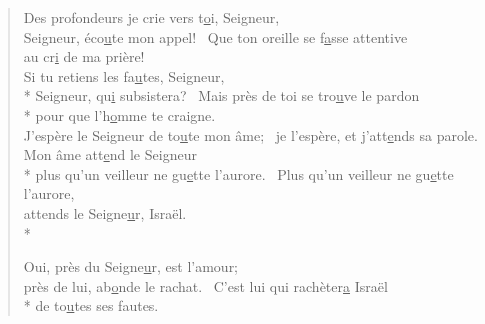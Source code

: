 
\begin{verse}

Des profondeurs je crie vers t\underline{o}i, Seigneur, \\
Seigneur, éco\underline{u}te mon appel!~\psalmstar
Que ton oreille se f\underline{a}sse attentive \\
au cr\underline{i} de ma prière! \\

Si tu retiens les fa\underline{u}tes, Seigneur, \\*
Seigneur, qu\underline{i} subsistera?~\psalmstar
{}Mais près de toi se tro\underline{u}ve le pardon \\*
pour que l’h\underline{o}mme te craigne. \\

J’espère le Seigneur de to\underline{u}te mon âme;~\psalmstar
je l’espère, et j’att\underline{e}nds sa parole. \\

Mon âme att\underline{e}nd le Seigneur \\*
plus qu’un veilleur ne gu\underline{e}tte l’aurore.~\psalmstar
Plus qu’un veilleur ne gu\underline{e}tte l’aurore, \\
attends le Seigne\underline{u}r, Israël. \\*

Oui, près du Seigne\underline{u}r, est l’amour; \\
près de lui, ab\underline{o}nde le rachat.~\psalmstar
{}C’est lui qui rachèter\underline{a} Israël \\*
de to\underline{u}tes ses fautes. \\
\end{verse}

